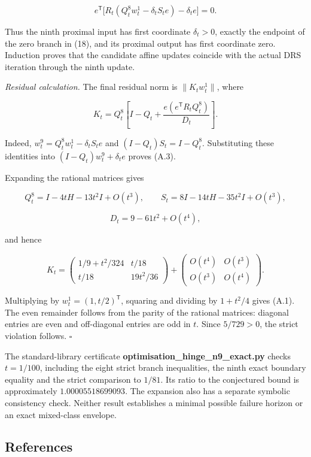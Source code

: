 \documentclass[
  british,
  11pt,
  a4paper,
]{article}
\let\oldsubsection\subsection
\renewcommand{\subsection}{\Needspace{5\baselineskip}\oldsubsection}
\begin{document}
\[
e^\mathsf T\bigl[R_t(Q_t^8w_t^1-\delta_t S_te)-\delta_t e\bigr]=0.
\]

Thus the ninth proximal input has first coordinate \(\delta_t>0\),
exactly the endpoint of the zero branch in (18), and its proximal output
has first coordinate zero. Induction proves that the candidate affine
updates coincide with the actual DRS iteration through the ninth update.

\emph{Residual calculation.} The final residual norm is
\(\|K_t w_t^1\|\), where

\[
K_t=Q_t^8\left[I-Q_t+
\frac{e(e^\mathsf T R_tQ_t^8)}{D_t}\right].
\tag{A.3}
\]

Indeed, \(w_t^9=Q_t^8w_t^1-\delta_t S_te\) and \((I-Q_t)S_t=I-Q_t^8\).
Substituting these identities into \((I-Q_t)w_t^9+\delta_t e\) proves
(A.3).

Expanding the rational matrices gives

\[
Q_t^8=I-4tH-13t^2I+O(t^3),\qquad
S_t=8I-14tH-35t^2I+O(t^3),
\]

\[D_t=9-61t^2+O(t^4),\]

and hence

\[
K_t=
\begin{pmatrix}
1/9+t^2/324&t/18\\
t/18&19t^2/36
\end{pmatrix}
+
\begin{pmatrix}
O(t^4)&O(t^3)\\
O(t^3)&O(t^4)
\end{pmatrix}.
\]

Multiplying by \(w_t^1=(1,t/2)^\mathsf T\), squaring and dividing by
\(1+t^2/4\) gives (A.1). The even remainder follows from the parity of
the rational matrices: diagonal entries are even and off-diagonal
entries are odd in \(t\). Since \(5/729>0\), the strict violation
follows. \(\square\)

The standard-library certificate
\textbf{optimisation\_hinge\_n9\_exact.py} checks \(t=1/100\), including
the eight strict branch inequalities, the ninth exact boundary equality
and the strict comparison to \(1/81\). Its ratio to the conjectured
bound is approximately \(1.00005518699093\). The expansion also has a
separate symbolic consistency check. Neither result establishes a
minimal possible failure horizon or an exact mixed-class envelope.

\subsection{References}\label{references}
\end{document}
